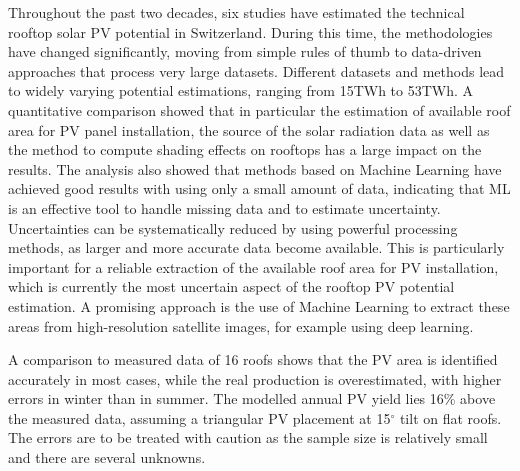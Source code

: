 Throughout the past two decades, six studies have estimated the technical rooftop solar PV potential in Switzerland. During this time, the methodologies have changed significantly, moving from simple rules of thumb to data-driven approaches that process very large datasets. Different datasets and methods lead to widely varying potential estimations, ranging from 15TWh to 53TWh. A quantitative comparison showed that in particular the estimation of available roof area for PV panel installation, the source of the solar radiation data as well as the method to compute shading effects on rooftops has a large impact on the results. The analysis also showed that methods based on Machine Learning have achieved good results with using only a small amount of data, indicating that ML is an effective tool to handle missing data and to estimate uncertainty. Uncertainties can be systematically reduced by using powerful processing methods, as larger and more accurate data become available. This is particularly important for a reliable extraction of the available roof area for PV installation, which is currently the most uncertain aspect of the rooftop PV potential estimation. A promising approach is the use of Machine Learning to extract these areas from high-resolution satellite images, for example using deep learning. 

A comparison to measured data of 16 roofs shows that the PV area is identified accurately in most cases, while the real production is overestimated, with higher errors in winter than in summer. The modelled annual PV yield lies 16\% above the measured data, assuming a triangular PV placement at 15$^\circ$ tilt on flat roofs. The errors are to be treated with caution as the sample size is relatively small and there are several unknowns.

